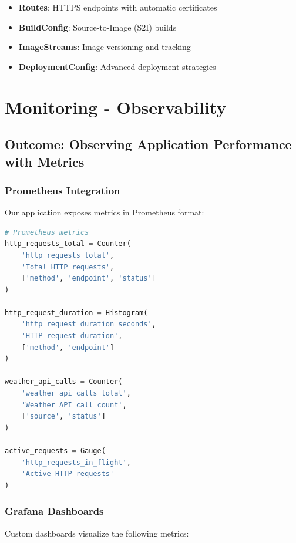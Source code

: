 \documentclass[12pt,a4paper]{article}
\begin{document}
\begin{itemize}
    \item \textbf{Routes}: HTTPS endpoints with automatic certificates
    \item \textbf{BuildConfig}: Source-to-Image (S2I) builds
    \item \textbf{ImageStreams}: Image versioning and tracking
    \item \textbf{DeploymentConfig}: Advanced deployment strategies
\end{itemize}

\section{Monitoring - Observability}

\subsection{Outcome: Observing Application Performance with Metrics}

\subsubsection{Prometheus Integration}

Our application exposes metrics in Prometheus format:

\begin{lstlisting}[language=python, caption=Metric Definitions]
# Prometheus metrics
http_requests_total = Counter(
    'http_requests_total',
    'Total HTTP requests',
    ['method', 'endpoint', 'status']
)

http_request_duration = Histogram(
    'http_request_duration_seconds',
    'HTTP request duration',
    ['method', 'endpoint']
)

weather_api_calls = Counter(
    'weather_api_calls_total',
    'Weather API call count',
    ['source', 'status']
)

active_requests = Gauge(
    'http_requests_in_flight',
    'Active HTTP requests'
)
\end{lstlisting}

\subsubsection{Grafana Dashboards}

Custom dashboards visualize the following metrics:
\end{document}
